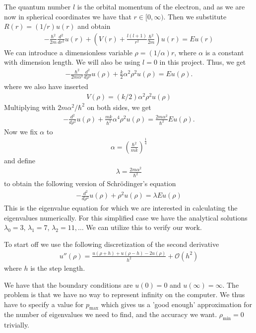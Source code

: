 \documentclass[11pt, a4paper]{article}
\begin{document}
The quantum number $l$ is the orbital momentum of the electron, and as we are now in spherical coordinates we have that $r \in [0,\infty)$.  
%
Then we substitute $R(r) = (1/r) u(r)$ and obtain
%
\begin{gather}
  -\frac{\hbar^2}{2 m} \frac{d^2}{dr^2} u(r) 
       + \left ( V(r) + \frac{l (l + 1)}{r^2}\frac{\hbar^2}{2 m}
                                    \right ) u(r) = E u(r)
\end{gather}
We can introduce a dimensionless variable $\rho = (1/\alpha)r$, where $\alpha$ is a constant with dimension length. We will also be using $l=0$ in this project. Thus, we get
\begin{gather}
  -\frac{\hbar^2}{2 m \alpha^2} \frac{d^2}{d\rho^2} u(\rho) 
       + \frac{k}{2} \alpha^2\rho^2u(\rho)  = E u(\rho) .
\end{gather}
where we also have inserted 
\begin{gather}
V(\rho) = (k/2)\alpha^2\rho^2u(\rho)
\end{gather}
Multiplying with $2m\alpha^2/\hbar^2$ on both sides, we get
\begin{gather}
-\frac{d^2}{d\rho^2} u(\rho) 
       + \frac{mk}{\hbar^2} \alpha^4\rho^2u(\rho)  = \frac{2m\alpha^2}{\hbar^2}E u(\rho) .
\end{gather}
Now we fix $\alpha$ to
\begin{gather}
\alpha = \left(\frac{\hbar^2}{mk}\right)^\frac{1}{4}
\end{gather}
and define
\begin{gather}
\lambda = \frac{2m\alpha^2}{\hbar^2}
\end{gather}
to obtain the following version of Schr\"odinger's equation
\begin{gather}
-\frac{d^2}{d\rho^2}u(\rho) +\rho^2u(\rho) = \lambda Eu(\rho)
\end{gather}
This is the eigenvalue equation for which we are interested in calculating the eigenvalues numerically. For this simplified case we have the analytical solutions $\lambda_0 = 3$, $\lambda_1 = 7$, $\lambda_2 = 11,\dots$ We can utilize this to verify our work.

To start off we use the following discretization of the second derivative
\begin{gather}
u''(\rho) = \frac{u(\rho+h)+u(\rho-h)-2u(\rho)}{h^2}+\mathcal{O}(h^2)
\end{gather}
where $h$ is the step length.

We have that the boundary conditions are $u(0) = 0$ and $u(\infty) = \infty$. The problem is that we have no way to represent infinity on the computer. We thus have to specify a value for $p_\text{max}$ which gives us a 'good enough' approximation for the number of eigenvalues we need to find, and the accuracy we want. $\rho_\text{min} = 0$ trivially.
\end{document}
